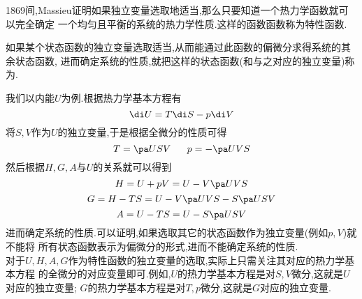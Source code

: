 \documentclass{ctexart}
\begin{document}
1869间,Massieu证明如果独立变量选取地适当,那么只要知道一个热力学函数就可以完全确定%
一个均匀且平衡的系统的热力学性质.这样的函数函数称为特性函数.
\begin{definition}[3F.3.1 特性函数]
    如果某个状态函数的独立变量选取适当,从而能通过此函数的偏微分求得系统的其余状态函数,%
    进而确定系统的性质,就把这样的状态函数(和与之对应的独立变量)称为.
\end{definition}
我们以内能$U$为例.根据热力学基本方程有
\[\di U=T\di S-p\di V\]
将$S,V$作为$U$的独立变量,于是根据全微分的性质可得
\[T=\pa USV\ \ \ \ \ p=-\pa UVS\]
然后根据$H,G,A$与$U$的关系就可以得到
\[H=U+pV=U-V\pa UVS\]
\[G=H-TS=U-V\pa UVS-S\pa USV\]
\[A=U-TS=U-S\pa USV\]
进而确定系统的性质.可以证明,如果选取其它的状态函数作为独立变量(例如$p,V$)就不能将%
所有状态函数表示为偏微分的形式,进而不能确定系统的性质.\\
\indent 对于$U,H,A,G$作为特性函数的独立变量的选取,实际上只需关注其对应的热力学基本方程%
的全微分的对应变量即可.例如,$U$的热力学基本方程是对$S,V$微分,这就是$U$对应的独立变量;%
$G$的热力学基本方程是对$T,p$微分,这就是$G$对应的独立变量.
\end{document}
